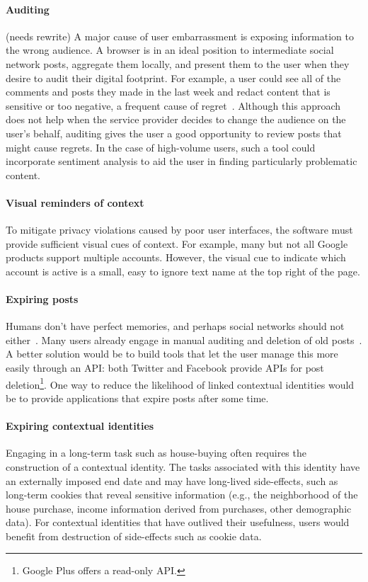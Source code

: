 \documentclass[10pt, conference, compsocconf]{IEEEtran}
\begin{document}
\paragraph{Auditing}
(needs rewrite)
A major cause of user embarrassment is exposing information to the wrong
audience. A browser is in an ideal position to intermediate social network
posts, aggregate them locally, and present them to the user when they desire to
audit their digital footprint.  For example, a user could see all of the
comments and posts they made in the last week and redact content that is
sensitive or too negative, a frequent cause of regret~\cite{wang}.  Although
this approach does not help when the service provider decides to change the
audience on the user's behalf, auditing gives the user a good opportunity to
review posts that might cause regrets. In the case of high-volume users, such a
tool could incorporate sentiment analysis to aid the user in finding
particularly problematic content.

\paragraph{Visual reminders of context}
To mitigate privacy violations caused by poor user interfaces, the software
must provide sufficient visual cues of context. For example, many but not all
Google products support multiple accounts. However, the visual cue to indicate
which account is active is a small, easy to ignore text name at the top right
of the page.

\paragraph{Expiring posts}
Humans don't have perfect memories, and perhaps social networks should not
either~\cite{delete}. Many users already engage in manual auditing and deletion
of old posts~\cite{fbtips2}. A better solution would be to build tools that let
the user manage this more easily through an API: both Twitter and Facebook
provide APIs for post deletion\footnote{Google Plus
offers a read-only API.}. One way to reduce the likelihood of linked contextual
identities would be to provide applications that expire posts after some time.

\paragraph{Expiring contextual identities}
Engaging in a long-term task such as house-buying
often requires the construction of a contextual identity. The tasks associated
with this identity have an externally imposed end date and may have long-lived
side-effects, such as long-term cookies that reveal sensitive information
(e.g., the neighborhood of the house purchase, income information derived from
purchases, other demographic data). For contextual identities that have
outlived their usefulness, users would benefit from destruction of side-effects
such as cookie data.
\end{document}
